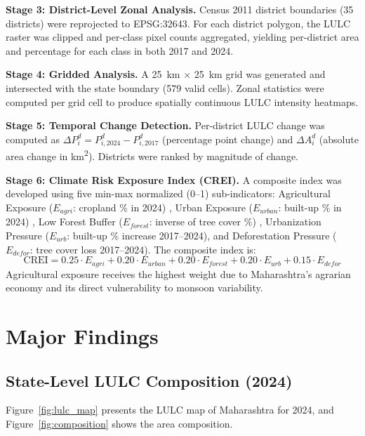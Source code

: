 \documentclass[12pt,a4paper]{article}
\begin{document}
\textbf{Stage 3: District-Level Zonal Analysis.}
Census 2011 district boundaries (35 districts) were reprojected to EPSG:32643. For each district polygon, the LULC raster was clipped and per-class pixel counts aggregated, yielding per-district area and percentage for each class in both 2017 and 2024.

\textbf{Stage 4: Gridded Analysis.}
A 25~km $\times$ 25~km grid was generated and intersected with the state boundary (579 valid cells). Zonal statistics were computed per grid cell to produce spatially continuous LULC intensity heatmaps.

\textbf{Stage 5: Temporal Change Detection.}
Per-district LULC change was computed as $\Delta P_i^{d} = P_{i,2024}^{d} - P_{i,2017}^{d}$ (percentage point change) and $\Delta A_i^{d}$ (absolute area change in km\textsuperscript{2}). Districts were ranked by magnitude of change.

\textbf{Stage 6: Climate Risk Exposure Index (CREI).}
A composite index was developed using five min-max normalized (0--1) sub-indicators: Agricultural Exposure ($E_{agri}$: cropland \% in 2024) \citep{mall2006water}, Urban Exposure ($E_{urban}$: built-up \% in 2024) \citep{oke1982energetic}, Low Forest Buffer ($E_{forest}$: inverse of tree cover \%) \citep{bonan2008forests}, Urbanization Pressure ($E_{urb}$: built-up \% increase 2017--2024), and Deforestation Pressure ($E_{defor}$: tree cover loss 2017--2024). The composite index is:
\begin{equation}
\text{CREI} = 0.25 \cdot E_{agri} + 0.20 \cdot E_{urban} + 0.20 \cdot E_{forest} + 0.20 \cdot E_{urb} + 0.15 \cdot E_{defor}
\label{eq:crei}
\end{equation}
Agricultural exposure receives the highest weight due to Maharashtra's agrarian economy and its direct vulnerability to monsoon variability.

\section{Major Findings}

\subsection{State-Level LULC Composition (2024)}

Figure~\ref{fig:lulc_map} presents the LULC map of Maharashtra for 2024, and Figure~\ref{fig:composition} shows the area composition.
\end{document}
